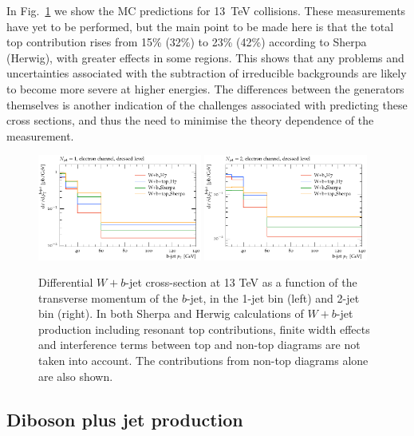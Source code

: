 \documentclass[11pt]{cernrep}
\begin{document}
In Fig.~\ref{fig:13tev} we show the MC predictions for 13~TeV collisions. These measurements have yet to be
performed, but the main point to be made here is that the total top contribution rises from 15\% (32\%)
to 23\% (42\%) according to Sherpa (Herwig), with greater effects in some regions. This shows that any
problems and uncertainties associated with the subtraction of irreducible backgrounds are likely to become
more severe at higher energies. The differences between the generators themselves is another indication of the 
challenges associated with predicting these cross sections, and thus the need to minimise the theory
dependence of the measurement.

\begin{figure}
\centering
	\includegraphics[width=0.48\textwidth]{13tev-1jet.pdf}
	\includegraphics[width=0.48\textwidth]{13tev-2jet.pdf}
\caption{\label{fig:13tev}
  Differential $W+b$-jet cross-section at 13 TeV as a function of the
  transverse momentum of the $b$-jet, in the 1-jet bin (left) and 2-jet bin (right).
  In both Sherpa and Herwig calculations of $W+b$-jet production including resonant top contributions, finite width effects 
  and interference terms between top and non-top diagrams are not
  taken into account. The contributions from non-top diagrams alone are also shown.}
\end{figure}

\subsection{Diboson plus jet production}
\end{document}
